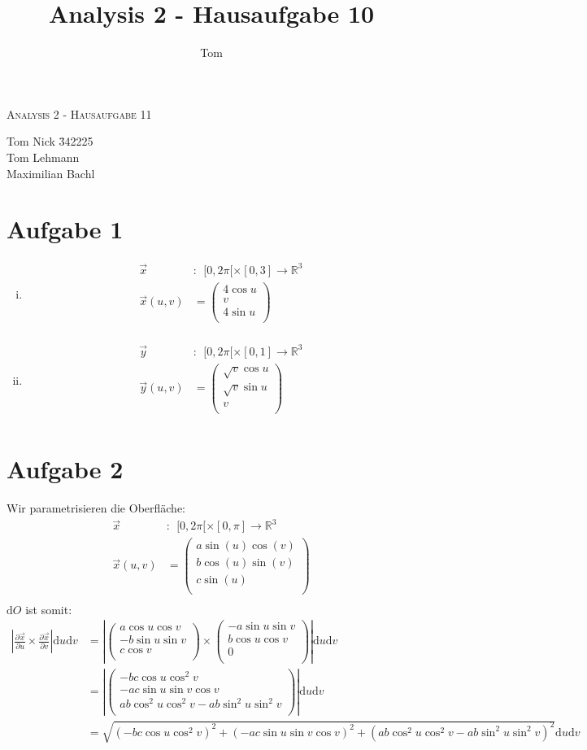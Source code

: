 \documentclass[10pt,a4paper,parskip=half]{scrartcl}
\author{Tom}
\title{Analysis 2 - Hausaufgabe 10}
\newcommand{\vecthree}[3]{\begin{pmatrix}#1\\#2\\#3\\\end {pmatrix}}
\begin{document}
\begin{center}
\textsc{\Large{Analysis 2 - Hausaufgabe 11}} \\
\end{center}
\begin{tabbing}
Tom Nick \hspace{1.4cm}\= 342225\\
Tom Lehmann\\
Maximilian Bachl
\end{tabbing}
\section*{Aufgabe 1}
\begin{enumerate}[(i)]
\item
\begin{align*}
\vec x&:~~ [0,2\pi[ \times [0,3] \to \mathbb{R}^3\\
\vec x(u,v) &= \vecthree{4\cos u}{v}{4\sin u} \\
\end{align*}
\item
\begin{align*}
\vec y&:~~ [0,2\pi[ \times [0,1] \to \mathbb{R}^3\\
\vec y(u,v) &= \vecthree{\sqrt v\cos u}{\sqrt v\sin u}{v} \\
\end{align*}
\end{enumerate}
\section*{Aufgabe 2}
Wir parametrisieren die Oberfläche:
\begin{align*}
\vec x&:~~ [0,2\pi[ \times [0,\pi] \to \mathbb{R}^3\\
\vec x(u,v) &= \vecthree{a\sin(u) \cos(v)}{b\cos(u)\sin(v)}{c \sin(u)} \\
\end{align*}
$\mathrm d O$ ist somit:
\begin{align*}
\left|\frac{\partial \vec x}{\partial u} \times \frac{\partial \vec x}{\partial v}\right| \mathrm d u \mathrm d v &= \left|\vecthree{a \cos u \cos v}{-b \sin u \sin v}{c \cos v} \times \vecthree{-a \sin u \sin v}{b \cos u \cos v}{0}\right| \mathrm d u \mathrm d v\\
&= \left|\vecthree{-bc \cos u \cos^2 v}{-ac \sin u \sin v \cos v}{ab \cos^2 u \cos^2 v - ab \sin^2 u \sin^2 v}\right| \mathrm d u \mathrm d v\\
&= \sqrt{\left(-bc \cos u \cos^2 v\right)^2 + \left(-ac \sin u \sin v \cos v\right)^2 + \left(ab \cos^2 u \cos^2 v - ab \sin^2 u \sin^2 v\right)^2} \mathrm d u \mathrm d v
\end{align*}
\end{document}
